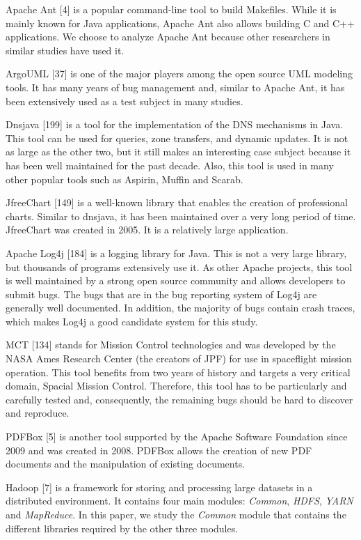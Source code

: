 \documentclass[12pt]{report}
\begin{document}
Apache Ant {[}4{]} is a popular command-line tool to build Makefiles.
While it is mainly known for Java applications, Apache Ant also allows
building C and C++ applications. We choose to analyze Apache Ant because
other researchers in similar studies have used it.

ArgoUML {[}37{]} is one of the major players among the open source UML
modeling tools. It has many years of bug management and, similar to
Apache Ant, it has been extensively used as a test subject in many
studies.

Dnsjava {[}199{]} is a tool for the implementation of the DNS mechanisms
in Java. This tool can be used for queries, zone transfers, and dynamic
updates. It is not as large as the other two, but it still makes an
interesting case subject because it has been well maintained for the
past decade. Also, this tool is used in many other popular tools such as
Aspirin, Muffin and Scarab.

JfreeChart {[}149{]} is a well-known library that enables the creation
of professional charts. Similar to dnsjava, it has been maintained over
a very long period of time. JfreeChart was created in 2005. It is a
relatively large application.

Apache Log4j {[}184{]} is a logging library for Java. This is not a very
large library, but thousands of programs extensively use it. As other
Apache projects, this tool is well maintained by a strong open source
community and allows developers to submit bugs. The bugs that are in the
bug reporting system of Log4j are generally well documented. In
addition, the majority of bugs contain crash traces, which makes Log4j a
good candidate system for this study.

MCT {[}134{]} stands for Mission Control technologies and was developed
by the NASA Ames Research Center (the creators of JPF) for use in
spaceflight mission operation. This tool benefits from two years of
history and targets a very critical domain, Spacial Mission Control.
Therefore, this tool has to be particularly and carefully tested and,
consequently, the remaining bugs should be hard to discover and
reproduce.

PDFBox {[}5{]} is another tool supported by the Apache Software
Foundation since 2009 and was created in 2008. PDFBox allows the
creation of new PDF documents and the manipulation of existing
documents.

Hadoop {[}7{]} is a framework for storing and processing large datasets
in a distributed environment. It contains four main modules:
\emph{Common}, \emph{HDFS}, \emph{YARN} and \emph{MapReduce}. In this
paper, we study the \emph{Common} module that contains the different
libraries required by the other three modules.
\end{document}
